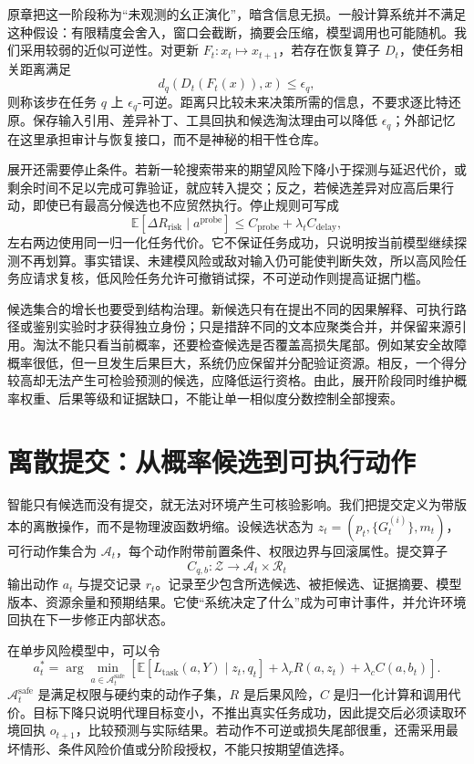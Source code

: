 原章把这一阶段称为“未观测的幺正演化”，暗含信息无损。一般计算系统并不满足这种假设：有限精度会舍入，窗口会截断，摘要会压缩，模型调用也可能随机。我们采用较弱的近似可逆性。对更新 $F_t:x_t\mapsto x_{t+1}$，若存在恢复算子 $D_t$，使任务相关距离满足
\[
d_q(D_t(F_t(x)),x)\le\epsilon_q,
\]
则称该步在任务 $q$ 上 $\epsilon_q$-可逆。距离只比较未来决策所需的信息，不要求逐比特还原。保存输入引用、差异补丁、工具回执和候选淘汰理由可以降低 $\epsilon_q$；外部记忆在这里承担审计与恢复接口，而不是神秘的相干性仓库。

展开还需要停止条件。若新一轮搜索带来的期望风险下降小于探测与延迟代价，或剩余时间不足以完成可靠验证，就应转入提交；反之，若候选差异对应高后果行动，即使已有最高分候选也不应贸然执行。停止规则可写成
\[
\mathbb E[\Delta R_{\mathrm{risk}}\mid a^{\mathrm{probe}}]\le C_{\mathrm{probe}}+\lambda_t C_{\mathrm{delay}},
\]
左右两边使用同一归一化任务代价。它不保证任务成功，只说明按当前模型继续探测不再划算。事实错误、未建模风险或敌对输入仍可能使判断失效，所以高风险任务应请求复核，低风险任务允许可撤销试探，不可逆动作则提高证据门槛。

候选集合的增长也要受到结构治理。新候选只有在提出不同的因果解释、可执行路径或鉴别实验时才获得独立身份；只是措辞不同的文本应聚类合并，并保留来源引用。淘汰不能只看当前概率，还要检查候选是否覆盖高损失尾部。例如某安全故障概率很低，但一旦发生后果巨大，系统仍应保留并分配验证资源。相反，一个得分较高却无法产生可检验预测的候选，应降低运行资格。由此，展开阶段同时维护概率权重、后果等级和证据缺口，不能让单一相似度分数控制全部搜索。

\section{离散提交：从概率候选到可执行动作}
\label{sec:section_7309}

智能只有候选而没有提交，就无法对环境产生可核验影响。我们把提交定义为带版本的离散操作，而不是物理波函数坍缩。设候选状态为 $z_t=(p_t,\{G_t^{(i)}\},m_t)$，可行动作集合为 $\mathcal A_t$，每个动作附带前置条件、权限边界与回滚属性。提交算子
\[
C_{q,b}:\mathcal Z\rightarrow\mathcal A_t\times\mathcal R_t
\]
输出动作 $a_t$ 与提交记录 $r_t$。记录至少包含所选候选、被拒候选、证据摘要、模型版本、资源余量和预期结果。它使“系统决定了什么”成为可审计事件，并允许环境回执在下一步修正内部状态。

在单步风险模型中，可以令
\[
a_t^*=\arg\min_{a\in\mathcal A_t^{\mathrm{safe}}}
\left[\mathbb E[L_{\mathrm{task}}(a,Y)\mid z_t,q_t]
+\lambda_r R(a,z_t)+\lambda_c C(a,b_t)\right].
\]
$\mathcal A_t^{\mathrm{safe}}$ 是满足权限与硬约束的动作子集，$R$ 是后果风险，$C$ 是归一化计算和调用代价。目标下降只说明代理目标变小，不推出真实任务成功，因此提交后必须读取环境回执 $o_{t+1}$，比较预测与实际结果。若动作不可逆或损失尾部很重，还需采用最坏情形、条件风险价值或分阶段授权，不能只按期望值选择。

